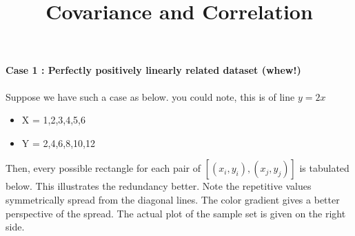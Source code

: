 \documentclass[float=false,crop=false]{standalone}
\title{Covariance and Correlation}
\begin{document}
    
    
    \maketitle
    
    

    \paragraph{Case 1 : Perfectly positively linearly related dataset
(whew!)}\label{case-1-perfectly-positively-linearly-related-dataset-whew}

Suppose we have such a case as below. you could note, this is of line
\(y=2x\)

\begin{itemize}
\tightlist
\item
  X = 1,2,3,4,5,6\\
\item
  Y = 2,4,6,8,10,12
\end{itemize}

Then, every possible rectangle for each pair of
\([ (x_i, y_i) , (x_j,y_j) ]\) is tabulated below. This illustrates the
redundancy better. Note the repetitive values symmetrically spread from
the diagonal lines. The color gradient gives a better perspective of the
spread. The actual plot of the sample set is given on the right side.
    \begin{center}
    \end{center}
    { \hspace*{\fill} \\}
    
\end{document}
